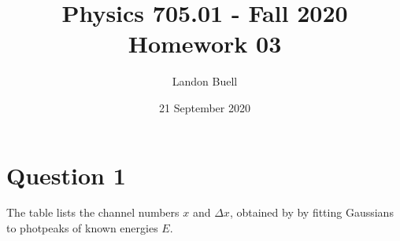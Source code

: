 \documentclass[12pt,letterpaper]{article}
\begin{document}

\title{Physics 705.01 - Fall 2020 \\ Homework 03}
\author{Landon Buell}
\date{21 September 2020}
\maketitle


\section*{Question 1}
The table lists the channel numbers $x$ and $\Delta x$, obtained by by fitting Gaussians to photpeaks of known energies $E$.


\newpage
 
\end{document}
